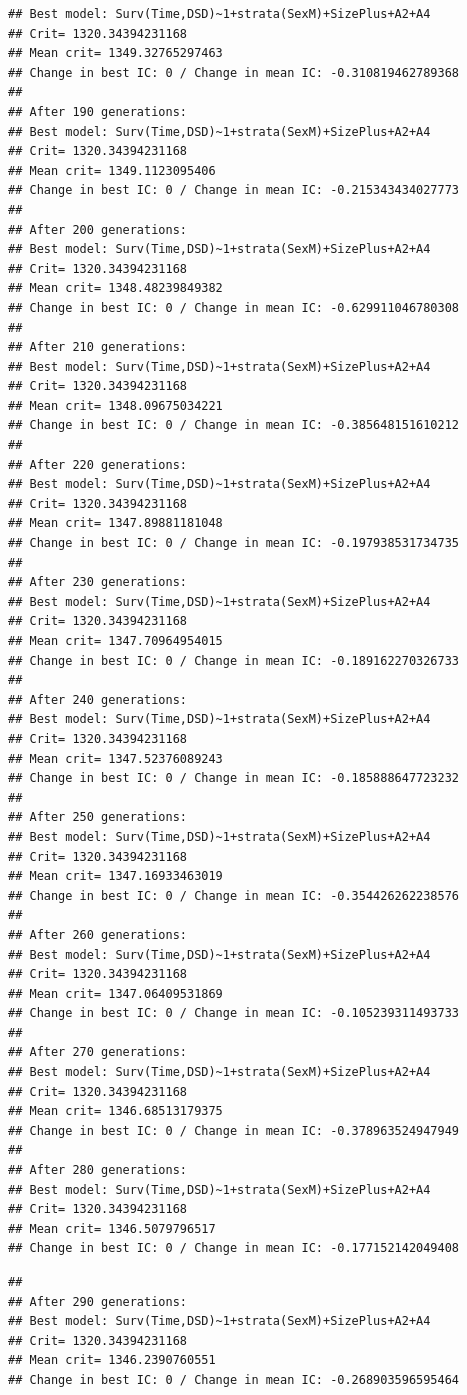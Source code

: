 \documentclass{article}\usepackage[]{graphicx}\usepackage[]{color}
\makeatletter
\newenvironment{kframe}{%
 \def\at@end@of@kframe{}%
 \ifinner\ifhmode%
  \def\at@end@of@kframe{\end{minipage}}%
  \begin{minipage}{\columnwidth}%
 \fi\fi%
 \def\FrameCommand##1{\hskip\@totalleftmargin \hskip-\fboxsep
 \colorbox{shadecolor}{##1}\hskip-\fboxsep
     \hskip-\linewidth \hskip-\@totalleftmargin \hskip\columnwidth}%
 \MakeFramed {\advance\hsize-\width
   \@totalleftmargin\z@ \linewidth\hsize
   \@setminipage}}%
 {\par\unskip\endMakeFramed%
 \at@end@of@kframe}
\newenvironment{knitrout}{}{} %
\makeatother
\begin{document}
\begin{knitrout}
\begin{kframe}
\begin{verbatim}
## Best model: Surv(Time,DSD)~1+strata(SexM)+SizePlus+A2+A4
## Crit= 1320.34394231168
## Mean crit= 1349.32765297463
## Change in best IC: 0 / Change in mean IC: -0.310819462789368
## 
## After 190 generations:
## Best model: Surv(Time,DSD)~1+strata(SexM)+SizePlus+A2+A4
## Crit= 1320.34394231168
## Mean crit= 1349.1123095406
## Change in best IC: 0 / Change in mean IC: -0.215343434027773
## 
## After 200 generations:
## Best model: Surv(Time,DSD)~1+strata(SexM)+SizePlus+A2+A4
## Crit= 1320.34394231168
## Mean crit= 1348.48239849382
## Change in best IC: 0 / Change in mean IC: -0.629911046780308
## 
## After 210 generations:
## Best model: Surv(Time,DSD)~1+strata(SexM)+SizePlus+A2+A4
## Crit= 1320.34394231168
## Mean crit= 1348.09675034221
## Change in best IC: 0 / Change in mean IC: -0.385648151610212
## 
## After 220 generations:
## Best model: Surv(Time,DSD)~1+strata(SexM)+SizePlus+A2+A4
## Crit= 1320.34394231168
## Mean crit= 1347.89881181048
## Change in best IC: 0 / Change in mean IC: -0.197938531734735
## 
## After 230 generations:
## Best model: Surv(Time,DSD)~1+strata(SexM)+SizePlus+A2+A4
## Crit= 1320.34394231168
## Mean crit= 1347.70964954015
## Change in best IC: 0 / Change in mean IC: -0.189162270326733
## 
## After 240 generations:
## Best model: Surv(Time,DSD)~1+strata(SexM)+SizePlus+A2+A4
## Crit= 1320.34394231168
## Mean crit= 1347.52376089243
## Change in best IC: 0 / Change in mean IC: -0.185888647723232
## 
## After 250 generations:
## Best model: Surv(Time,DSD)~1+strata(SexM)+SizePlus+A2+A4
## Crit= 1320.34394231168
## Mean crit= 1347.16933463019
## Change in best IC: 0 / Change in mean IC: -0.354426262238576
## 
## After 260 generations:
## Best model: Surv(Time,DSD)~1+strata(SexM)+SizePlus+A2+A4
## Crit= 1320.34394231168
## Mean crit= 1347.06409531869
## Change in best IC: 0 / Change in mean IC: -0.105239311493733
## 
## After 270 generations:
## Best model: Surv(Time,DSD)~1+strata(SexM)+SizePlus+A2+A4
## Crit= 1320.34394231168
## Mean crit= 1346.68513179375
## Change in best IC: 0 / Change in mean IC: -0.378963524947949
## 
## After 280 generations:
## Best model: Surv(Time,DSD)~1+strata(SexM)+SizePlus+A2+A4
## Crit= 1320.34394231168
## Mean crit= 1346.5079796517
## Change in best IC: 0 / Change in mean IC: -0.177152142049408
\end{verbatim}


{\ttfamily\noindent\color{warningcolor}{\#\# Warning in fitter(X, Y, strats, offset, init, control, weights = weights, : Loglik converged before variable\ \ 11 ; beta may be infinite.}}\begin{verbatim}
## 
## After 290 generations:
## Best model: Surv(Time,DSD)~1+strata(SexM)+SizePlus+A2+A4
## Crit= 1320.34394231168
## Mean crit= 1346.2390760551
## Change in best IC: 0 / Change in mean IC: -0.268903596595464
\end{verbatim}



\end{kframe}
\end{knitrout}
\end{document}
